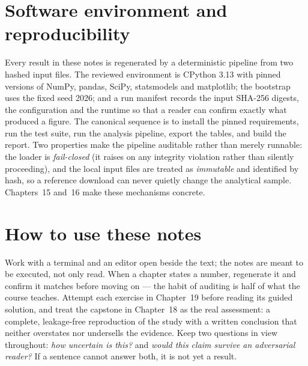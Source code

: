 \hypertarget{software-environment-and-reproducibility}{%
\section{Software environment and
reproducibility}\label{software-environment-and-reproducibility}}

Every result in these notes is regenerated by a deterministic pipeline
from two hashed input files. The reviewed environment is CPython 3.13
with pinned versions of NumPy, pandas, SciPy, statsmodels and matplotlib;
the bootstrap uses the fixed seed 2026; and a run manifest records the
input SHA-256 digests, the configuration and the runtime so that a reader
can confirm exactly what produced a figure. The canonical sequence is to
install the pinned requirements, run the test suite, run the analysis
pipeline, export the tables, and build the report. Two properties make
the pipeline auditable rather than merely runnable: the loader is
\emph{fail-closed} (it raises on any integrity violation rather than
silently proceeding), and the local input files are treated as
\emph{immutable} and identified by hash, so a reference download can never
quietly change the analytical sample. Chapters~15 and~16 make these
mechanisms concrete.

\hypertarget{how-to-use-these-notes}{%
\section{How to use these
notes}\label{how-to-use-these-notes}}

Work with a terminal and an editor open beside the text; the notes are
meant to be executed, not only read. When a chapter states a number,
regenerate it and confirm it matches before moving on --- the habit of
auditing is half of what the course teaches. Attempt each exercise in
Chapter~19 before reading its guided solution, and treat the capstone in
Chapter~18 as the real assessment: a complete, leakage-free reproduction
of the study with a written conclusion that neither overstates nor
undersells the evidence. Keep two questions in view throughout: \emph{how
uncertain is this?} and \emph{would this claim survive an adversarial
reader?} If a sentence cannot answer both, it is not yet a result.


